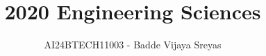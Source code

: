 \documentclass[journal]{IEEEtran}
\begin{document}

\vspace{3cm}

\title{2020 Engineering Sciences}
\author{AI24BTECH11003 - Badde Vijaya Sreyas}
{\let\newpage\relax\maketitle}

\renewcommand{\thefigure}{\theenumi}
\renewcommand{\thetable}{\theenumi}
\setlength{\intextsep}{10pt} %


\renewcommand{\thetable}{\theenumi}
\end{document}

